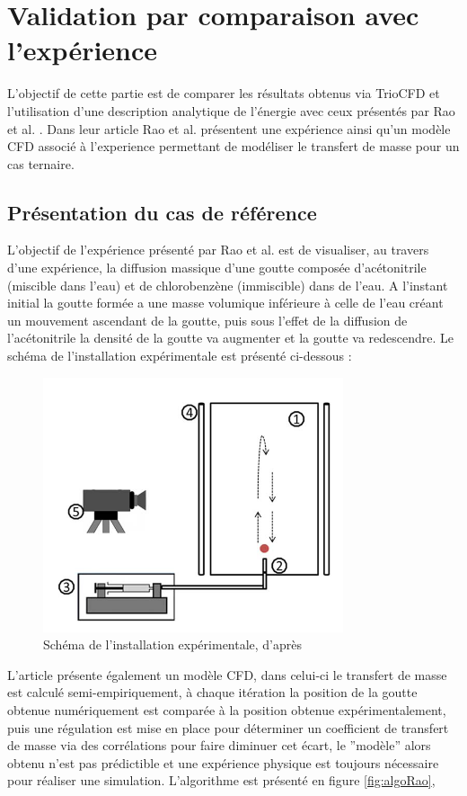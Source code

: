 \chapter{Validation par comparaison avec l'expérience}
L'objectif de cette partie est de comparer les résultats obtenus via TrioCFD et l'utilisation d'une description analytique de l'énergie avec ceux présentés par Rao et al. \cite{rao_influence_2015}. Dans leur article Rao et al. présentent une expérience ainsi qu'un modèle CFD associé à l'experience permettant de modéliser le transfert de masse pour un cas ternaire.
\section{Présentation du cas de référence}
L'objectif de l'expérience présenté par Rao et al. est de visualiser, au travers d'une expérience, la diffusion massique d'une goutte composée d'acétonitrile (miscible dans l'eau) et de chlorobenzène (immiscible) dans de l'eau. A l'instant initial la goutte formée a une masse volumique inférieure à celle de l'eau créant un mouvement ascendant de la goutte, puis sous l'effet de la diffusion de l'acétonitrile la densité de la goutte va augmenter et la goutte va redescendre. Le schéma de l'installation expérimentale est présenté ci-dessous :
\begin{figure}[H]
	\centering
	\includegraphics[width=0.3\linewidth]{figure/exp}
	\caption{Schéma de l'installation expérimentale, d'après \cite{rao_influence_2015}}
	\label{fig:exp}
\end{figure}
L'article présente également un modèle CFD, dans celui-ci le transfert de masse est calculé semi-empiriquement, à chaque itération la position de la goutte obtenue numériquement est comparée à la position obtenue expérimentalement, puis une régulation est mise en place pour déterminer un coefficient de transfert de masse via des corrélations pour faire diminuer cet écart, le ”modèle” alors obtenu n’est pas prédictible et une expérience physique est toujours nécessaire pour réaliser une simulation. L'algorithme est présenté en figure \ref{fig:algoRao}, 
